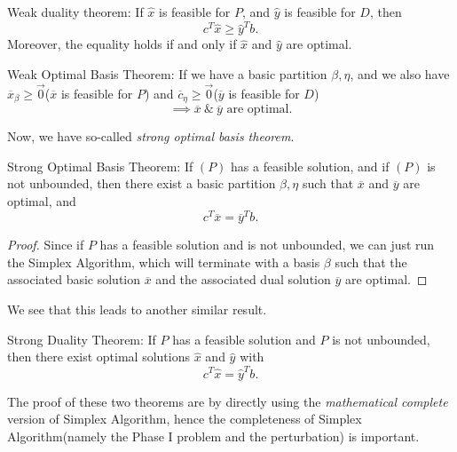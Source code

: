 \begin{prev}
	Weak duality theorem: If \(\hat{x}\) is feasible for \(P\), and \(\hat{y}\)
	is feasible for \(D\), then
	\[
		c^{T} \hat{x} \geq  \hat{y}^{T} b.
	\]
	Moreover, the equality holds if and only if \(\hat{x}\) and \(\hat{y}\) are optimal.
\end{prev}

\begin{theorem}
	Weak Optimal Basis Theorem: If we have a basic partition \(\beta, \eta\), and we also have
	\(\overline{x}_{\beta}\geq  \vec{0}\)(\(\overline{x}\) is feasible for \(P\)) and \(\overline{c}_{\eta} \geq  \vec{0}\)(\(\overline{y}\) is feasible for \(D\))
	\[
		\implies \overline{x}\ \&\ \overline{y} \text{ are optimal}.
	\]
\end{theorem}

Now, we have so-called \emph{strong optimal basis theorem}.
\begin{theorem}
	Strong Optimal Basis Theorem: If \((P)\) has a feasible solution, and if \((P)\) is not unbounded, then there exist a basic partition \(\beta, \eta\) such that
	\(\overline{x}\) and \(\overline{y}\) are optimal, and
	\[
		c^{T} \overline{x} = \overline{y}^{T} b.
	\]
\end{theorem}
\begin{proof}
	Since if \(P\) has a feasible solution and is not unbounded, we can just run the Simplex Algorithm, which will terminate with a basis \(\beta\) such
	that the associated basic solution \(\overline{x}\) and the associated dual solution \(\overline{y}\) are optimal.
\end{proof}

We see that this leads to another similar result.
\begin{theorem}
	\label{strong duality theorem}
	Strong Duality Theorem: If \(P\) has a feasible solution and \(P\) is not unbounded, then there exist optimal solutions
	\(\hat{x}\) and \(\hat{y}\) with
	\[
		c^{T} \hat{x} = \hat{y}^{T} b.
	\]
\end{theorem}

\begin{note}
	The proof of these two theorems are by directly using the \emph{mathematical complete} version of Simplex Algorithm, hence the completeness of
	Simplex Algorithm(namely the Phase I problem and the perturbation) is important.
\end{note}

